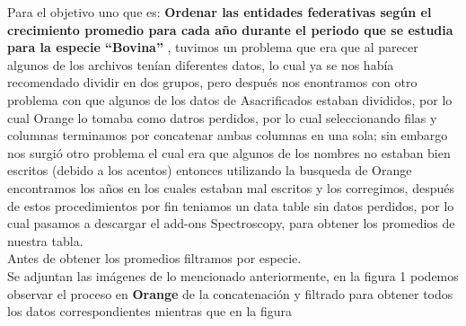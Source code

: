 \item Para el objetivo uno que es: {\bfseries Ordenar las entidades federativas según el crecimiento promedio para cada año durante el periodo que se estudia para la especie “Bovina”} , tuvimos un problema que era que al parecer algunos de los archivos tenían diferentes datos, lo cual ya se nos había recomendado dividir en dos grupos, pero después nos enontramos con otro problema con que algunos de los datos de Asacrificados estaban divididos, por lo cual Orange lo tomaba como datros perdidos, por lo cual seleccionando filas y columnas terminamos por concatenar ambas columnas en una sola; sin embargo nos surgió otro problema el cual era que algunos de los nombres no estaban bien escritos (debido a los acentos) entonces utilizando la busqueda de Orange encontramos los años en los cuales estaban mal escritos y los corregimos, después de estos procedimientos por fin teniamos un data table sin datos perdidos, por lo cual pasamos a descargar el add-ons Spectroscopy, para obtener los promedios de nuestra tabla. \\
Antes de obtener los promedios filtramos por especie.\\
Se adjuntan las imágenes de lo mencionado anteriormente, en la figura 1 podemos observar el proceso en {\bfseries Orange } de la concatenación y filtrado para obtener todos los datos correspondientes mientras que en la figura 
